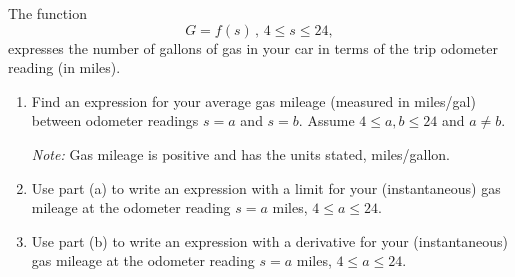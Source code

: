 \documentclass{ximera}
\begin{document}
\begin{question} \label{QLFefdf45}
The function 
\[
     G = f(s)  \, , \, 4\leq s \leq 24 ,
\]
expresses the number of gallons of gas in your car in terms of the trip odometer reading (in miles).

\begin{enumerate}
\item Find an expression for your average gas mileage (measured in miles/gal) between odometer readings $s=a$ and $s=b$. Assume $4 \leq a, b \leq 24$ and $a\neq b$.

\emph{Note:} Gas mileage is positive and has the units stated, miles/gallon.

\item Use part (a) to write an expression with a limit for your (instantaneous) gas mileage at the odometer reading $s=a$ miles, $4\leq a \leq 24$.

\item Use part (b) to write an expression with a derivative for your (instantaneous) gas mileage at the odometer reading $s=a$ miles, $4\leq a \leq 24$.
\end{enumerate}
\end{question}
\end{document}
